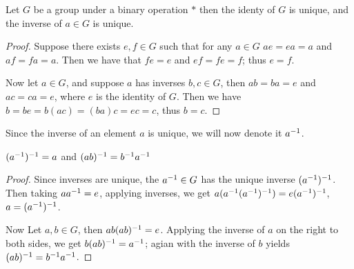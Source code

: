\begin{theorem}\label{1.2.1}
  Let $G$ be a group under a binary operation  $\ast$ then the identy of  $G$
  is unique, and the inverse of  $a \in G$ is unique.
\end{theorem}
\begin{proof}
  Suppose there exists $e,f \in G$ such that for any  $a \in G$  $ae=ea=a$ and
  $af=fa=a$. Then we have that $fe=e$ and  $ef=fe=f$; thus  $e=f$.

  Now let  $a \in G$, and suppose  $a$ has inverses  $b,c \in G$, then
  $ab=ba=e$ and  $ac=ca=e$, where  $e$ is the identity of  $G$. Then we have
  $b=be=b(ac)=(ba)c=ec=c$, thus $b=c$.
\end{proof}
\begin{remark}
  Since the inverse of an element $a$ is unique, we will now denote it
  $a^{-1}$.
\end{remark}
\begin{corollary}
  $(a^{-1})^{-1}=a$ and $(ab)^{-1}=b^{-1}a^{-1}$
\end{corollary}
\begin{proof}
  Since inverses are unique, the $a^{-1} \in G$ has the unique inverse
  $(a^{-1})^{-1}$. Then  taking $aa^{-1}=e$, applying inverses, we get
  $a(a^{-1}(a^{-1})^{-1})=e(a^{-1})^{-1}$, $a=(a^{-1})^{-1}$.

  Now Let $a,b \in G$, then $ab(ab)^{-1}=e$. Applying the inverse of $a$ on
  the right to both sides, we get  $b(ab)^{-1}=a^{-1}$; agian with the
  inverse of $b$ yields  $(ab)^{-1}=b^{-1}a^{-1}$.
\end{proof}


